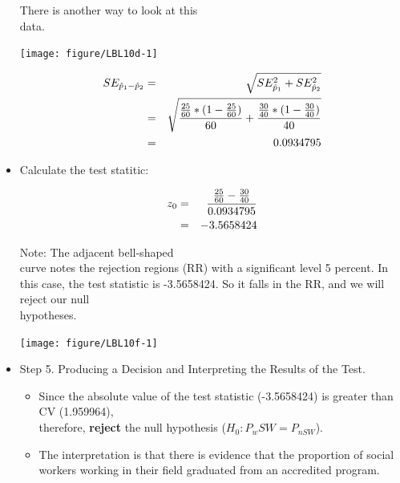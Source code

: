 \documentclass[11pt, chapterprefix=true]{scrbook}\usepackage[]{graphicx}\usepackage[]{color}
\begin{document}
\begin{itemize}
\begin{minipage}[h]{6cm}
\end{minipage} \hfill
\begin{minipage}[h]{6cm}

There is another way to look at this \\ data.



{\centering \texttt{[image: figure/LBL10d-1]} 

}




\end{minipage}

\begin{eqnarray*}
    SE_{\hat{p}_1-\hat{p}_2} &=& \sqrt{SE_{\hat{p}_1}^2 + SE_{\hat{p}_2}^2} \\
             &=& \sqrt{ \frac{\frac{25}{60} *(1 - \frac{25}{60})}{60} + \frac{\frac{30}{40} * (1 - \frac{30}{40})}{40} } \\ \vspace{3mm}
             &=& 0.0934795
  \end{eqnarray*}
    

  \item Calculate the test statitic:
  
    \begin{eqnarray*}
    z_0 &=& \frac{\frac{25}{60} - \frac{30}{40}}{0.0934795} \\ \vspace{3mm}
        &=& -3.5658424
    \end{eqnarray*}
    
\begin{minipage}[ht]{6cm}

Note: The adjacent bell-shaped \\ curve notes the rejection regions (RR) with a significant level 5 percent.  In this case, the test statistic is -3.5658424.  So it falls in the RR, and we will reject our null \\ hypotheses.

\end{minipage} \hfill
\begin{minipage}[ht]{6cm}
    


{\centering \texttt{[image: figure/LBL10f-1]} 

}




\end{minipage}


\item Step 5.  Producing a Decision and Interpreting the Results of the Test.
	\begin{itemize}
	\samepage
	\item Since the absolute value of the test statistic (-3.5658424) is greater than CV (1.959964), \\ therefore, \textbf{reject} the null hypothesis ($H_0: P_wSW = P_{nSW}$).
	\samepage
	\item The interpretation is that there is evidence that the proportion of 
social workers working in their field graduated from an accredited program.
	\end{itemize}
	 

\end{itemize}
\end{document}
